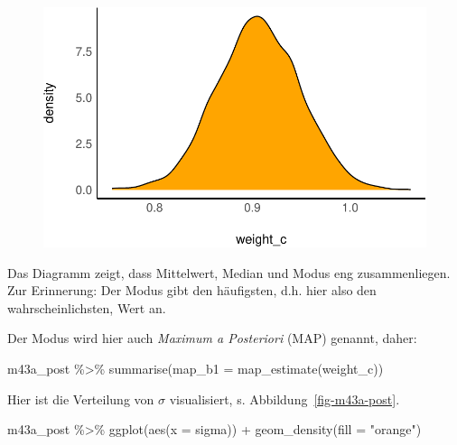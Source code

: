 \documentclass[
  a4paper,
  DIV=11]{scrreprt}
\newenvironment{Shaded}{\begin{snugshade}}{\end{snugshade}}
\newcommand{\AttributeTok}[1]{\textcolor[rgb]{0.40,0.45,0.13}{#1}}
\newcommand{\FunctionTok}[1]{\textcolor[rgb]{0.28,0.35,0.67}{#1}}
\newcommand{\NormalTok}[1]{\textcolor[rgb]{0.00,0.23,0.31}{#1}}
\newcommand{\SpecialCharTok}[1]{\textcolor[rgb]{0.37,0.37,0.37}{#1}}
\newcommand{\StringTok}[1]{\textcolor[rgb]{0.13,0.47,0.30}{#1}}
\theoremstyle{definition}
\theoremstyle{remark}
\begin{document}
\begin{figure}[H]

{\centering \includegraphics{./lineare-modelle_files/figure-pdf/unnamed-chunk-21-1.pdf}

}

\end{figure}

Das Diagramm zeigt, dass Mittelwert, Median und Modus eng
zusammenliegen. Zur Erinnerung: Der Modus gibt den häufigsten, d.h. hier
also den wahrscheinlichsten, Wert an.

Der Modus wird hier auch \emph{Maximum a Posteriori} (MAP) genannt,
daher:

\begin{Shaded}
\begin{Highlighting}[]
\NormalTok{m43a\_post }\SpecialCharTok{\%\textgreater{}\%} 
  \FunctionTok{summarise}\NormalTok{(}\AttributeTok{map\_b1 =} \FunctionTok{map\_estimate}\NormalTok{(weight\_c))}
\end{Highlighting}
\end{Shaded}

Hier ist die Verteilung von \(\sigma\) visualisiert, s.
Abbildung~\ref{fig-m43a-post}.

\begin{Shaded}
\begin{Highlighting}[]
\NormalTok{m43a\_post }\SpecialCharTok{\%\textgreater{}\%} 
  \FunctionTok{ggplot}\NormalTok{(}\FunctionTok{aes}\NormalTok{(}\AttributeTok{x =}\NormalTok{ sigma)) }\SpecialCharTok{+}
  \FunctionTok{geom\_density}\NormalTok{(}\AttributeTok{fill =} \StringTok{"orange"}\NormalTok{)}
\end{Highlighting}
\end{Shaded}
\end{document}
